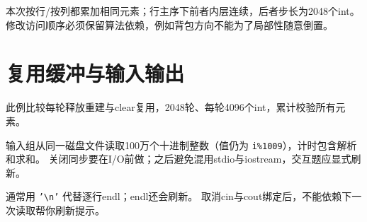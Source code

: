 本次按行/按列都累加相同元素；行主序下前者内层连续，后者步长为2048个int。
修改访问顺序必须保留算法依赖，例如背包方向不能为了局部性随意倒置。

\newpage
\section{复用缓冲与输入输出}
此例比较每轮释放重建与clear复用，2048轮、每轮4096个int，累计校验所有元素。

输入组从同一磁盘文件读取100万个十进制整数（值仍为 \texttt{i\%1009}），计时包含解析和求和。
关闭同步要在I/O前做；之后避免混用stdio与iostream，交互题应显式刷新。

通常用 \texttt{'\textbackslash n'} 代替逐行endl；endl还会刷新。
取消cin与cout绑定后，不能依赖下一次读取帮你刷新提示。
